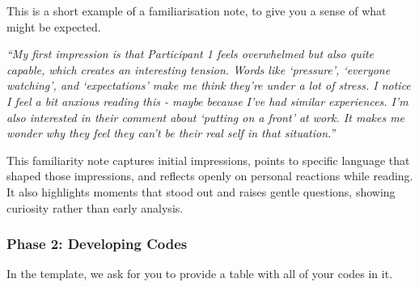 \documentclass[
  english,
  letterpaper,
  DIV=11,
  numbers=noendperiod]{scrreprt}
\begin{document}
\begin{tcolorbox}[enhanced jigsaw, breakable, bottomtitle=1mm, leftrule=.75mm, opacityback=0, colbacktitle=quarto-callout-warning-color!10!white, opacitybacktitle=0.6, toprule=.15mm, colback=white, left=2mm, coltitle=black, bottomrule=.15mm, titlerule=0mm, title={Example}, toptitle=1mm, colframe=quarto-callout-warning-color-frame, arc=.35mm, rightrule=.15mm]

This is a short example of a familiarisation note, to give you a sense
of what might be expected.

\emph{``My first impression is that Participant 1 feels overwhelmed but
also quite capable, which creates an interesting tension. Words like
`pressure', `everyone watching', and `expectations' make me think
they're under a lot of stress. I notice I feel a bit anxious reading
this - maybe because I've had similar experiences. I'm also interested
in their comment about `putting on a front' at work. It makes me wonder
why they feel they can't be their real self in that situation.''}

This familiarity note captures initial impressions, points to specific
language that shaped those impressions, and reflects openly on personal
reactions while reading. It also highlights moments that stood out and
raises gentle questions, showing curiosity rather than early analysis.

\end{tcolorbox}

\subsubsection{Phase 2: Developing
Codes}\label{phase-2-developing-codes}

\begin{tcolorbox}[enhanced jigsaw, breakable, bottomtitle=1mm, leftrule=.75mm, opacityback=0, colbacktitle=quarto-callout-important-color!10!white, opacitybacktitle=0.6, toprule=.15mm, colback=white, left=2mm, coltitle=black, bottomrule=.15mm, titlerule=0mm, title=\textcolor{quarto-callout-important-color}{\faExclamation}\hspace{0.5em}{Phase 2: What is asked for?}, toptitle=1mm, colframe=quarto-callout-important-color-frame, arc=.35mm, rightrule=.15mm]

In the template, we ask for you to provide a table with all of your
codes in it.

\end{tcolorbox}
\end{document}
